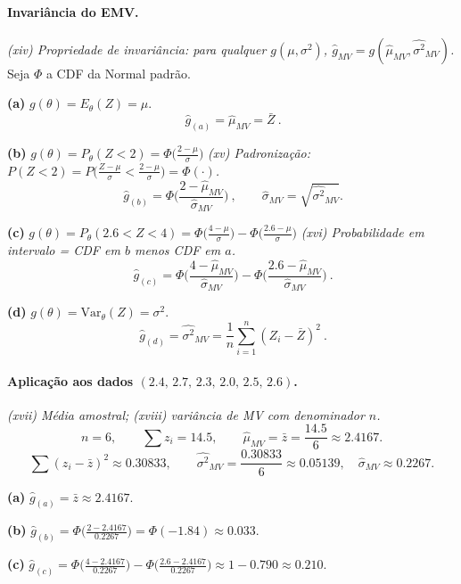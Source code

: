 \paragraph{Invariância do EMV.}
\emph{(xiv) Propriedade de invariância: para qualquer $g(\mu,\sigma^2)$, 
$\widehat g_{MV}=g(\widehat\mu_{MV},\widehat{\sigma^2}_{MV})$.}
Seja $\Phi$ a CDF da Normal padrão.

\medskip
\textbf{(a)} $g(\theta)=E_\theta(Z)=\mu$.
\[
\boxed{\ \widehat g_{(a)}=\widehat\mu_{MV}=\bar Z\ }.
\]

\textbf{(b)} $g(\theta)=P_\theta(Z<2)=\Phi\!\big(\frac{2-\mu}{\sigma}\big)$ 
\emph{(xv) Padronização: $P(Z<2)=P\big(\tfrac{Z-\mu}{\sigma}<\tfrac{2-\mu}{\sigma}\big)=\Phi(\cdot)$.}
\[
\boxed{\ \widehat g_{(b)}=\Phi\!\Big(\frac{2-\widehat\mu_{MV}}{\widehat\sigma_{MV}}\Big)\ },\qquad
\widehat\sigma_{MV}=\sqrt{\widehat{\sigma^2}_{MV}}.
\]

\textbf{(c)} $g(\theta)=P_\theta(2.6<Z<4)=
\Phi\!\big(\tfrac{4-\mu}{\sigma}\big)-\Phi\!\big(\tfrac{2.6-\mu}{\sigma}\big)$ 
\emph{(xvi) Probabilidade em intervalo = CDF em $b$ menos CDF em $a$.}
\[
\boxed{\ \widehat g_{(c)}=\Phi\!\Big(\frac{4-\widehat\mu_{MV}}{\widehat\sigma_{MV}}\Big)
-\Phi\!\Big(\frac{2.6-\widehat\mu_{MV}}{\widehat\sigma_{MV}}\Big)\ }.
\]

\textbf{(d)} $g(\theta)=\mathrm{Var}_\theta(Z)=\sigma^2$.
\[
\boxed{\ \widehat g_{(d)}=\widehat{\sigma^2}_{MV}=\frac{1}{n}\sum_{i=1}^n (Z_i-\bar Z)^2\ }.
\]

\paragraph{Aplicação aos dados $(2.4,\,2.7,\,2.3,\,2.0,\,2.5,\,2.6)$.}
\emph{(xvii) Média amostral; (xviii) variância de MV com denominador $n$.}
\[
n=6,\qquad \sum z_i=14.5,\qquad 
\widehat\mu_{MV}=\bar z=\frac{14.5}{6}\approx 2.4167.
\]
\[
\sum (z_i-\bar z)^2\approx 0.30833,\qquad
\widehat{\sigma^2}_{MV}=\frac{0.30833}{6}\approx 0.05139,\quad
\widehat\sigma_{MV}\approx 0.2267.
\]

\noindent
\textbf{(a)} $\widehat g_{(a)}=\bar z\approx 2.4167$.

\noindent
\textbf{(b)} $\widehat g_{(b)}=\Phi\!\big(\tfrac{2-2.4167}{0.2267}\big)
=\Phi(-1.84)\approx 0.033$.

\noindent
\textbf{(c)} $\widehat g_{(c)}=\Phi\!\big(\tfrac{4-2.4167}{0.2267}\big)
-\Phi\!\big(\tfrac{2.6-2.4167}{0.2267}\big)
\approx 1-0.790\approx 0.210$.

